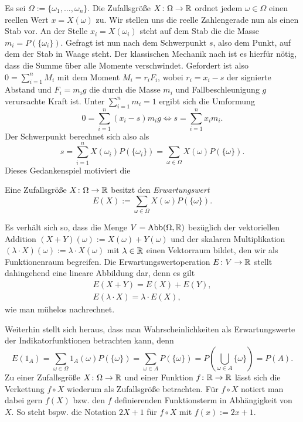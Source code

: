 Es sei $\Omega:=\{\omega_1,\ldots,\omega_n\}$. Die Zufallsgröße
$X\colon\Omega\to\mathbb R$ ordnet jedem $\omega\in\Omega$ einen reellen
Wert $x=X(\omega)$ zu. Wir stellen uns die reelle Zahlengerade nun als
einen Stab vor. An der Stelle $x_i=X(\omega_i)$ steht auf dem Stab die
die Masse $m_i=P(\{\omega_i\})$. Gefragt ist nun nach dem Schwerpunkt
$s$, also dem Punkt, auf dem der Stab in Waage steht. Der klassischen
Mechanik nach ist es hierfür nötig, dass die Summe über alle Momente
verschwindet. Gefordert ist also $0=\sum_{i=1}^n M_i$ mit dem Moment
$M_i=r_i F_i$, wobei $r_i=x_i-s$ der signierte Abstand und $F_i = m_ig$
die durch die Masse $m_i$ und Fallbeschleunigung $g$ verursachte Kraft
ist. Unter $\sum_{i=1}^n m_i = 1$ ergibt sich die Umformung
\[\textstyle 0 = \sum_{i=1}^n (x_i-s)m_i g\iff s = \sum_{i=1}^n x_im_i.\]
Der Schwerpunkt berechnet sich also als
\[\textstyle s = \sum_{i=1}^n X(\omega_i)P(\{\omega_i\})
= \sum_{\omega\in\Omega} X(\omega)P(\{\omega\}).\]
Dieses Gedankenspiel motiviert die
\begin{Definition}[Erwartungswert]\newlinefirst
Eine Zufallsgröße $X\colon\Omega\to\mathbb R$ besitzt den \emph{Erwartungswert}
\[E(X) := \sum_{\omega\in\Omega}X(\omega)P(\{\omega\}).\]
\end{Definition}
Es verhält sich so, dass die Menge $V=\operatorname{Abb}(\Omega,\mathbb R)$ bezüglich
der vektoriellen Addition $(X+Y)(\omega):=X(\omega)+Y(\omega)$ und
der skalaren Multiplikation $(\lambda\cdot X)(\omega):=\lambda\cdot X(\omega)$
mit $\lambda\in\mathbb R$ einen Vektorraum bildet, den wir als Funktionenraum
begreifen. Die Erwartungswertoperation $E\colon V\to\mathbb R$ stellt dahingehend eine
lineare Abbildung dar, denn es gilt
\begin{gather*}
E(X+Y) = E(X) + E(Y),\\
E(\lambda\cdot X) = \lambda\cdot E(X),
\end{gather*}
wie man mühelos nachrechnet.

Weiterhin stellt sich heraus, dass man Wahrscheinlichkeiten als
Erwartungswerte der Indikatorfunktionen betrachten kann, denn
\[E(1_A) = \sum_{\omega\in\Omega}1_A(\omega)P(\{\omega\})
= \sum_{\omega\in A} P(\{\omega\})
= P(\bigcup_{\omega\in A}\{\omega\}) = P(A).\]
Zu einer Zufallsgröße $X\colon\Omega\to\mathbb R$ und einer Funktion
$f\colon\mathbb R\to\mathbb R$ lässt sich die Verkettung $f\circ X$ wiederum
als Zufallsgröße betrachten. Für $f\circ X$ notiert man dabei gern
$f(X)$ bzw. den $f$ definierenden Funktionsterm in Abhängigkeit von $X$.
So steht bspw. die Notation $2X+1$ für $f\circ X$ mit $f(x):=2x+1$.

